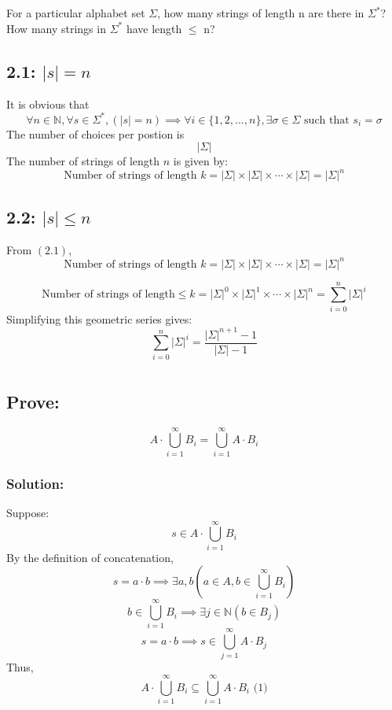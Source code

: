 \documentclass[12pt]{article}
\begin{document}
\section{}
For a particular alphabet set \(\Sigma\), how many strings of length n are there in \(\Sigma^*\)? 
How many strings in \(\Sigma^*\) have length \(\leq\) n?

\subsection*{2.1: \(|s| = n\)}
It is obvious that 
\[
\forall n \in \mathbb{N}, \forall s \in \Sigma^*, (|s| = n) \implies \forall i \in \{1, 2, \dots, n\}, \exists \sigma \in \Sigma \text{ such that } s_i = \sigma
\]
The number of choices per postion is 
\[|\Sigma|\]
The number of strings of length \( n \) is given by:
\[
\text{Number of strings of length } k = |\Sigma| \times |\Sigma| \times \cdots \times |\Sigma| = |\Sigma|^n
\]

\subsection*{2.2: \(|s| \leq n\)}
From \((2.1)\), 
\[
\text{Number of strings of length } k = |\Sigma| \times |\Sigma| \times \cdots \times |\Sigma| = |\Sigma|^n
\]

\[
\text{Number of strings of length} \leq k = |\Sigma|^0 \times |\Sigma|^1 \times \cdots \times |\Sigma|^n = \sum_{i=0}^{n}|\Sigma|^i
\]
Simplifying this geometric series gives:
\[\sum_{i=0}^{n}|\Sigma|^i = \frac{|\Sigma|^{n+1}-1}{|\Sigma|-1}\]


\section{}
\subsection*{Prove:}
\[
A\cdot\bigcup\limits_{i=1}^{\infty} B_i=\bigcup\limits_{i=1}^{\infty}A\cdot B_i
\]
\subsubsection*{Solution:}
Suppose:
\[s\in A\cdot\bigcup\limits_{i=1}^{\infty} B_i\]
By the definition of concatenation,
\[s = a \cdot b \implies \exists a, b (a \in A, b\in\bigcup\limits_{i=1}^{\infty} B_i )\]
\[b\in\bigcup\limits_{i=1}^{\infty} B_i \implies\exists j \in \mathbb{N}(b \in B_j)\]
\[s = a \cdot b \implies s \in \bigcup\limits_{j=1}^{\infty}A\cdot B_j\]
Thus,
\[
A\cdot\bigcup\limits_{i=1}^{\infty} B_i \subseteq \bigcup\limits_{i=1}^{\infty}A\cdot B_i   \text{      (1)}
\]
\end{document}
